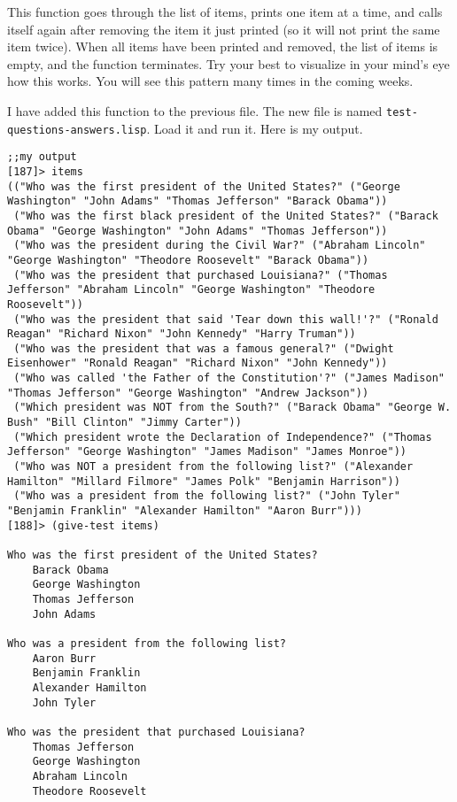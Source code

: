 \documentclass{article}
\begin{document}
This function goes through the list of items, prints one item at a time, and calls itself again after removing the item it just printed (so it will not print the same item twice). When all items have been printed and removed, the list of items is empty, and the function terminates. Try your best to visualize in your mind's eye how this works. You will see this pattern many times in the coming weeks.

I have added this function to the previous file. The new file is named \texttt{test-questions-answers.lisp}. Load it and run it. Here is my output.
\lstset{language=Lisp,numbers=left,keepspaces=false,basicstyle=\small,numberstyle=\tiny,breaklines=true,showstringspaces=false}
\begin{lstlisting}[caption = My output]
;;my output
[187]> items
(("Who was the first president of the United States?" ("George Washington" "John Adams" "Thomas Jefferson" "Barack Obama"))
 ("Who was the first black president of the United States?" ("Barack Obama" "George Washington" "John Adams" "Thomas Jefferson"))
 ("Who was the president during the Civil War?" ("Abraham Lincoln" "George Washington" "Theodore Roosevelt" "Barack Obama"))
 ("Who was the president that purchased Louisiana?" ("Thomas Jefferson" "Abraham Lincoln" "George Washington" "Theodore Roosevelt"))
 ("Who was the president that said 'Tear down this wall!'?" ("Ronald Reagan" "Richard Nixon" "John Kennedy" "Harry Truman"))
 ("Who was the president that was a famous general?" ("Dwight Eisenhower" "Ronald Reagan" "Richard Nixon" "John Kennedy"))
 ("Who was called 'the Father of the Constitution'?" ("James Madison" "Thomas Jefferson" "George Washington" "Andrew Jackson"))
 ("Which president was NOT from the South?" ("Barack Obama" "George W. Bush" "Bill Clinton" "Jimmy Carter"))
 ("Which president wrote the Declaration of Independence?" ("Thomas Jefferson" "George Washington" "James Madison" "James Monroe"))
 ("Who was NOT a president from the following list?" ("Alexander Hamilton" "Millard Filmore" "James Polk" "Benjamin Harrison"))
 ("Who was a president from the following list?" ("John Tyler" "Benjamin Franklin" "Alexander Hamilton" "Aaron Burr")))
[188]> (give-test items)

Who was the first president of the United States?
    Barack Obama
    George Washington
    Thomas Jefferson
    John Adams

Who was a president from the following list?
    Aaron Burr
    Benjamin Franklin
    Alexander Hamilton
    John Tyler

Who was the president that purchased Louisiana?
    Thomas Jefferson
    George Washington
    Abraham Lincoln
    Theodore Roosevelt


\end{lstlisting}
\end{document}
